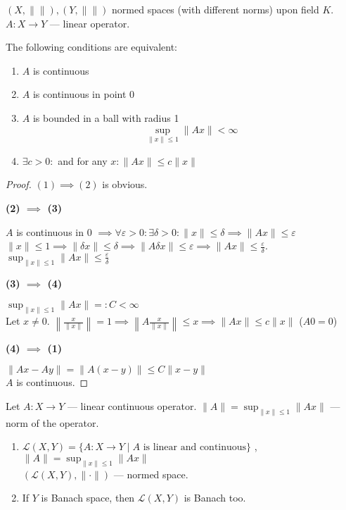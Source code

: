 \hr


$(X, \|\|), (Y, \|\|)$ normed spaces (with different norms) upon field $K$.\\
 $A: X\to Y$ --- linear operator.

 \begin{theorem}
   The following conditions are equivalent:
   \begin{enumerate}
     \item $A$ is continuous
     \item $A$ is continuous in point $0$ 
     \item $A$ is bounded in a ball with radius 1 \[ 
       \sup_{\|x\| \le 1} \|Ax\| < \infty \] 
     \item $\exists c>0:$ and for any $x : \|Ax\| \le c \|x\|$ 
   \end{enumerate}
 \end{theorem}

 \begin{proof}
   $(1) \implies (2) $ is obvious.

   \textbf{(2) $\implies$ (3)}

   $A$ is continuous in 0 $\implies \forall  \varepsilon > 0 : \exists \delta > 0 : \|x\| \le  \delta \implies \|Ax\| \le  \varepsilon$ \\
   $\|x\|\le 1 \implies \|\delta x\| \le  \delta \implies \|A\delta x\| \le  \varepsilon \implies \|A x\| \le  \frac{\varepsilon}{\delta}$. \\
   $\sup_{\|x\| \le  1} \|A x\| \le  \frac{\varepsilon}{\delta}$ 

   \textbf{(3) $\implies$ (4)}

   $\sup_{\|x\| \le  1} \|A x\| =: C < \infty$\\
   Let $x \neq  0.$ $\left\| \frac{x}{\|x\|} \right\| = 1 \implies \left\|  A \frac{x}{\|x\|} \right\| \le  x \implies \|Ax\| \le  c \|x\|$ ($A0 = 0$)

   \textbf{(4) $\implies$ (1)}

   $\|A x - A y\| = \|A (x - y)\| \le  C \| x - y \|$ \\
   $A$ is continuous.
 \end{proof}


 \begin{definition}
   Let $A: X \to Y$ --- linear continuous operator. $\|A\| = \sup_{\|x\| \le  1} \|Ax\|$ --- norm of the operator.
 \end{definition}


 \begin{theorem}
   \begin{enumerate}
     \item $\mathcal{L}(X,Y) = \{A: X \to Y \mid A \text{ is linear and continuous}\} $ , $\|A\| = \sup_{\|x\| \le 1} \|A x\|$ \\
       $\left( \mathcal{L}(X,Y), \|\cdot\| \right) $ --- normed space.
     \item  If $Y$ is Banach space, then $\mathcal{L}(X,Y)$ is Banach too.
   \end{enumerate}
 \end{theorem}

